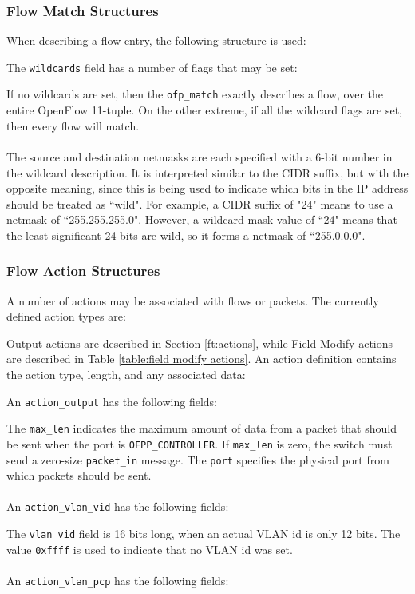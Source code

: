 \subsubsection{Flow Match Structures}
When describing a flow entry, the following structure is used:


The \verb|wildcards| field has a number of flags that may be set:


If no wildcards are set, then the \verb|ofp_match| exactly describes a flow, over the entire OpenFlow 11-tuple.  On the other extreme, if all the wildcard flags are set, then every flow will match.  
\\\\
The source and destination netmasks are each specified with a 6-bit number in the wildcard description. It is interpreted similar to the CIDR suffix, but with the opposite meaning, since this is being used to indicate which bits in the IP address should be treated as ``wild". For example, a CIDR suffix of "24" means to use a netmask of ``255.255.255.0". However, a wildcard mask value of ``24" means that the least-significant 24-bits are wild, so it forms a netmask of ``255.0.0.0". 

\subsubsection{Flow Action Structures}
A number of actions may be associated with flows or packets.  The currently defined action types are:

 
Output actions are described in Section \ref{ft:actions}, while Field-Modify actions are described in Table \ref{table:field modify actions}.  An action definition contains the action type, length, and any associated data:


An \verb|action_output| has the following fields:


The \verb|max_len| indicates the maximum amount of data from a packet that should be sent when the port is \verb|OFPP_CONTROLLER|.  If \verb|max_len| is zero, the switch must send a zero-size \verb|packet_in| message.  The \verb|port| specifies the physical port from which packets should be sent. 
 \\\\
An \verb|action_vlan_vid| has the following fields:


The \verb|vlan_vid| field is 16 bits long, when an actual VLAN id is only 12 bits. The value \verb|0xffff| is used to indicate that no VLAN id was set.
\\\\
An \verb|action_vlan_pcp| has the following fields:

